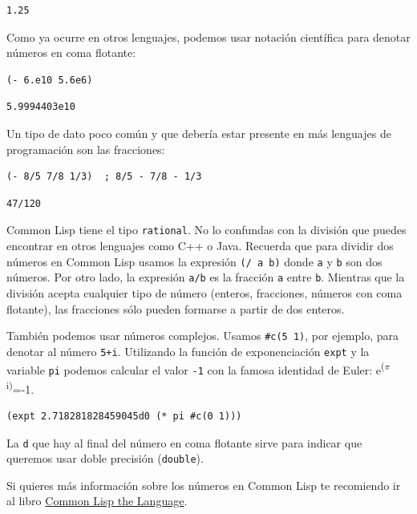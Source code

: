 \documentclass[11pt]{article}
\begin{document}
\begin{verbatim}
1.25
\end{verbatim}


Como ya ocurre en otros lenguajes, podemos usar notación científica para denotar números en coma flotante:

\begin{verbatim}
(- 6.e10 5.6e6)
\end{verbatim}

\begin{verbatim}
5.9994403e10
\end{verbatim}


Un tipo de dato poco común y que debería estar presente en más lenguajes de programación son las fracciones:

\begin{verbatim}
(- 8/5 7/8 1/3)  ; 8/5 - 7/8 - 1/3
\end{verbatim}

\begin{verbatim}
47/120
\end{verbatim}


Common Lisp tiene el tipo \texttt{rational}. No lo confundas con la división que puedes encontrar en otros lenguajes como C++ o Java. Recuerda que para dividir dos números en Common Lisp usamos la expresión \texttt{(/ a b)} donde \texttt{a} y \texttt{b} son dos números. Por otro lado, la expresión \texttt{a/b} es la fracción \texttt{a} entre \texttt{b}. Mientras que la división acepta cualquier tipo de número (enteros, fracciones, números con coma flotante), las fracciones sólo pueden formarse a partir de dos enteros.

También podemos usar números complejos. Usamos \texttt{\#c(5 1)}, por ejemplo, para denotar al número \texttt{5+i}. Utilizando la función de exponenciación \texttt{expt} y la variable \texttt{pi} podemos calcular el valor \texttt{-1} con la famosa identidad de Euler: e\textsuperscript{(\(\pi\)i)}=-1.

\begin{verbatim}
(expt 2.718281828459045d0 (* pi #c(0 1)))
\end{verbatim}

La \texttt{d} que hay al final del número en coma flotante sirve para indicar que queremos usar doble precisión (\texttt{double}). 

Si quieres más información sobre los números en Common Lisp te recomiendo ir al libro \href{https://www.cs.cmu.edu/Groups/AI/html/cltl/clm/node16.html}{Common Lisp the Language}.
\end{document}
